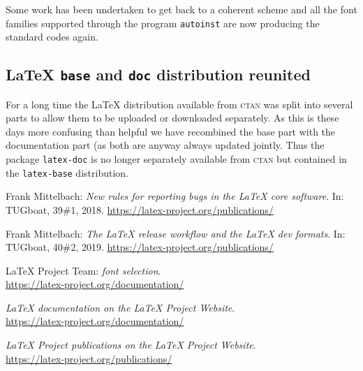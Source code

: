 \documentclass{ltnews}
\providecommand\CTAN{\textsc{ctan}}
\begin{document}
Some work has been undertaken to get back to a coherent scheme and
all the font families supported through the program \texttt{autoinst}
are now producing the standard codes again. 


\subsection{\LaTeX{} \texttt{base} and \texttt{doc} distribution reunited}
      
For a long time the \LaTeX{} distribution available from \CTAN{} was
split into several parts to allow them to be uploaded or downloaded
separately. As this is these days more confusing than helpful we have
recombined the base part with the documentation part (as both are
anyway always updated jointly. Thus the package \texttt{latex-doc}
is no longer separately available from \CTAN{} but contained in the
\texttt{latex-base} distribution.


\begin{thebibliography}{9}

 Frank Mittelbach:
  \emph{New rules for reporting bugs in the \LaTeX{} core software}.  
  In: TUGboat, 39\#1, 2018.
  \url{https://latex-project.org/publications/}

  
 Frank Mittelbach:
  \emph{The
  \LaTeX{} release workflow and the \LaTeX{} dev formats}.  
  In: TUGboat, 40\#2, 2019.
  \url{https://latex-project.org/publications/}

 \LaTeX{} Project Team:
  \emph{\LaTeXe{} font selection}.\\  
  \url{https://latex-project.org/documentation/}

  \emph{\LaTeX{} documentation on the \LaTeX{} Project Website}.\\  
  \url{https://latex-project.org/documentation/}

  \emph{\LaTeX{} Project publications on the \LaTeX{} Project Website}.\\
  \url{https://latex-project.org/publications/}

\end{thebibliography}
\end{document}
